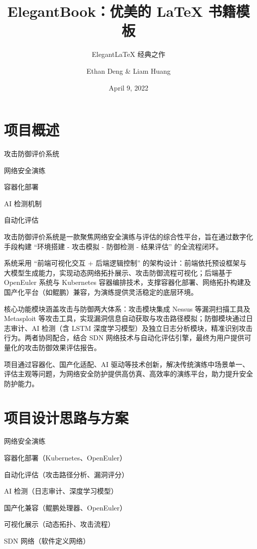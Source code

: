 \documentclass[lang=cn,10pt]{elegantbook}
\title{ElegantBook：优美的 \LaTeX{} 书籍模板}
\subtitle{Elegant\LaTeX{} 经典之作}
\author{Ethan Deng \& Liam Huang}
\institute{Elegant\LaTeX{} Program}
\date{April 9, 2022}
\begin{document}
\maketitle
\frontmatter

\tableofcontents

\mainmatter

\chapter{项目概述}
\begin{introduction}
    \item 攻击防御评价系统
    \item 网络安全演练
    \item 容器化部署
    \item AI 检测机制
    \item 自动化评估
\end{introduction}
攻击防御评价系统是一款聚焦网络安全演练与评估的综合性平台，旨在通过数字化手段构建 “环境搭建 - 攻击模拟 - 防御检测 - 结果评估” 的全流程闭环。​

系统采用 “前端可视化交互 + 后端逻辑控制” 的架构设计：前端依托预设框架与大模型生成能力，实现动态网络拓扑展示、攻击防御流程可视化；后端基于 OpenEuler 系统与 Kubernetes 容器编排技术，支撑容器化部署、网络拓扑构建及国产化平台（如鲲鹏）兼容，为演练提供灵活稳定的底层环境。​

核心功能模块涵盖攻击与防御两大体系：攻击模块集成 Nessus 等漏洞扫描工具及 Metasploit 等攻击工具，实现漏洞信息自动获取与攻击路径模拟；防御模块通过日志审计、AI 检测（含 LSTM 深度学习模型）及独立日志分析模块，精准识别攻击行为。两者协同配合，结合 SDN 网络技术与自动化评估引擎，最终为用户提供可量化的攻击防御效果评估报告。​

项目通过容器化、国产化适配、AI 驱动等技术创新，解决传统演练中场景单一、评估主观等问题，为网络安全防护提供高仿真、高效率的演练平台，助力提升安全防护能力。

\chapter{项目设计思路与方案}
\begin{introduction}
  \item 网络安全演练
  \item 容器化部署（Kubernetes、OpenEuler）
  \item 自动化评估（攻击路径分析、漏洞评分）
  \item AI 检测（日志审计、深度学习模型）
  \item 国产化兼容（鲲鹏处理器、OpenEuler）
  \item 可视化展示（动态拓扑、攻击流程）
  \item SDN 网络（软件定义网络）
\end{introduction}
\end{document}
